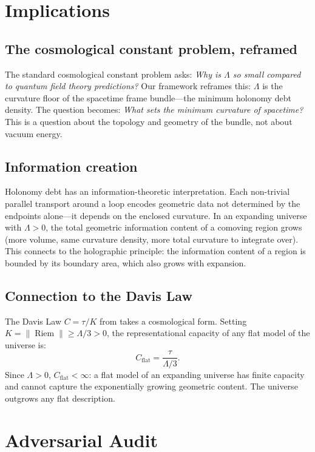 \documentclass[12pt]{amsart}
\theoremstyle{definition}
\newcommand{\Riem}{\operatorname{Riem}}
\begin{document}
\section{Implications}

\subsection{The cosmological constant problem, reframed}

The standard cosmological constant problem asks: \emph{Why is $\Lambda$ so small compared to quantum field theory predictions?}  Our framework reframes this: $\Lambda$ is the curvature floor of the spacetime frame bundle---the minimum holonomy debt density.  The question becomes: \emph{What sets the minimum curvature of spacetime?}  This is a question about the topology and geometry of the bundle, not about vacuum energy.

\subsection{Information creation}

Holonomy debt has an information-theoretic interpretation.  Each non-trivial parallel transport around a loop encodes geometric data not determined by the endpoints alone---it depends on the enclosed curvature.  In an expanding universe with $\Lambda > 0$, the total geometric information content of a comoving region grows (more volume, same curvature density, more total curvature to integrate over).  This connects to the holographic principle: the information content of a region is bounded by its boundary area, which also grows with expansion.

\subsection{Connection to the Davis Law}

The Davis Law $C = \tau/K$ from \cite{davis2026} takes a cosmological form.  Setting $K = \|\Riem\| \geq \Lambda/3 > 0$, the representational capacity of any flat model of the universe is:
\[
C_{\mathrm{flat}} = \frac{\tau}{\Lambda/3}.
\]
Since $\Lambda > 0$, $C_{\mathrm{flat}} < \infty$: a flat model of an expanding universe has finite capacity and cannot capture the exponentially growing geometric content.  The universe outgrows any flat description.


\section{Adversarial Audit}
\end{document}
